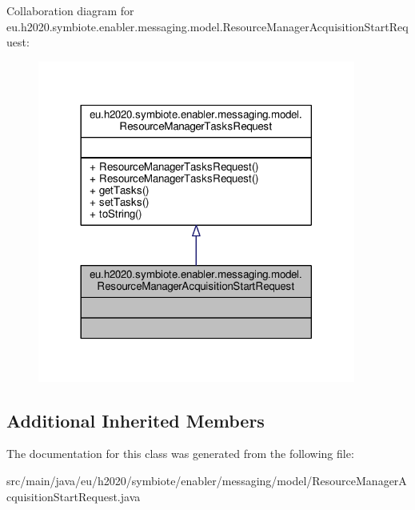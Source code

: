 Collaboration diagram for eu.\+h2020.\+symbiote.\+enabler.\+messaging.\+model.\+Resource\+Manager\+Acquisition\+Start\+Request\+:\nopagebreak
\begin{figure}[H]
\begin{center}
\leavevmode
\includegraphics[width=296pt]{classeu_1_1h2020_1_1symbiote_1_1enabler_1_1messaging_1_1model_1_1ResourceManagerAcquisitionStartRequest__coll__graph}
\end{center}
\end{figure}
\subsection*{Additional Inherited Members}


The documentation for this class was generated from the following file\+:\begin{DoxyCompactItemize}
\item 
src/main/java/eu/h2020/symbiote/enabler/messaging/model/Resource\+Manager\+Acquisition\+Start\+Request.\+java\end{DoxyCompactItemize}
